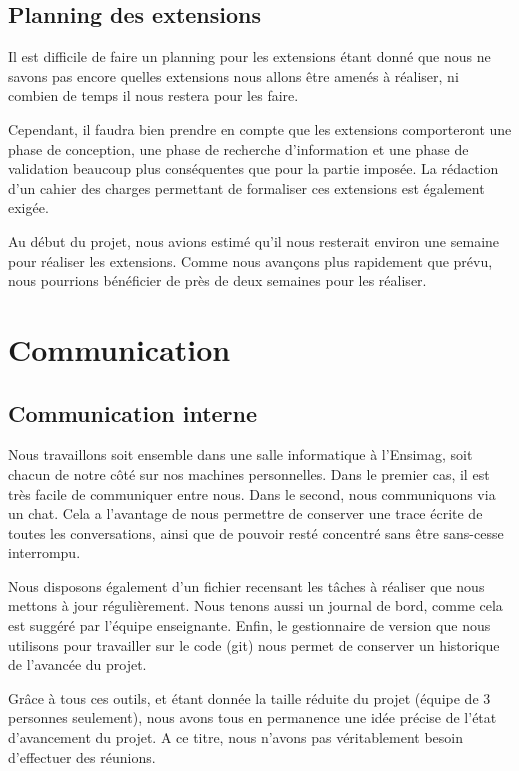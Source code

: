\documentclass[a4paper, 11pt, titlepage]{article}
\begin{document}
\subsection{Planning des extensions}

Il est difficile de faire un planning pour les extensions étant donné que nous ne savons pas encore quelles extensions nous allons être amenés à réaliser, ni combien de temps il nous restera pour les faire. 

Cependant, il faudra bien prendre en compte que les extensions comporteront une phase de conception, une phase de recherche d'information et une phase de validation beaucoup plus conséquentes que pour la partie imposée. La rédaction d'un cahier des charges permettant de formaliser ces extensions est également exigée.

Au début du projet, nous avions estimé qu'il nous resterait environ une semaine pour réaliser les extensions. Comme nous avançons plus rapidement que prévu, nous pourrions bénéficier de près de deux semaines pour les réaliser.

\section{Communication}

\subsection{Communication interne}

Nous travaillons soit ensemble dans une salle informatique à l'Ensimag, soit chacun de notre côté sur nos machines personnelles. Dans le premier cas, il est très facile de communiquer entre nous. Dans le second, nous communiquons via un chat. Cela a l'avantage de nous permettre de conserver une trace écrite de toutes les conversations, ainsi que de pouvoir resté concentré sans être sans-cesse interrompu.

Nous disposons également d'un fichier recensant les tâches à réaliser que nous mettons à jour régulièrement. Nous tenons aussi un journal de bord, comme cela est suggéré par l'équipe enseignante. Enfin, le gestionnaire de version que nous utilisons pour travailler sur le code (git) nous permet de conserver un historique de l'avancée du projet.

Grâce à tous ces outils, et étant donnée la taille réduite du projet (équipe de 3 personnes seulement), nous avons tous en permanence une idée précise de l'état d'avancement du projet. A ce titre, nous n'avons pas véritablement besoin d'effectuer des réunions.
\end{document}
